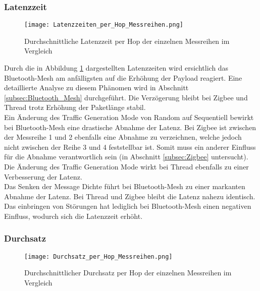 \subsubsection{Latenzzeit}\label{subsec:VergleichLatenzzeitMessreihen}

\begin{figure}[H]
	\centering
	\texttt{[image: Latenzzeiten\_per\_Hop\_Messreihen.png]}
	\caption{Durchschnittliche Latenzzeit per Hop der einzelnen Messreihen im Vergleich}\label{fig:Latenzzeiten_per_Hop_Messreihen}
\end{figure}

Durch die in Abbildung \ref{fig:Latenzzeiten_per_Hop_Messreihen} dargestellten Latenzzeiten wird ersichtlich das Bluetooth-Mesh am anfälligsten auf die Erhöhung der Payload reagiert. Eine detaillierte Analyse zu diesem Phänomen wird in Abschnitt \ref{subsec:Bluetooth_Mesh} durchgeführt. Die Verzögerung bleibt bei Zigbee und Thread trotz Erhöhung der Paketlänge stabil. \\

Ein Änderung des Traffic Generation Mode von Random auf Sequentiell bewirkt bei Bluetooth-Mesh eine drastische Abnahme der Latenz. Bei Zigbee ist zwischen der Messreihe 1 und 2 ebenfalls eine Abnahme zu verzeichnen, welche jedoch nicht zwischen der Reihe 3 und 4 feststellbar ist. Somit muss ein anderer Einfluss für die Abnahme verantwortlich sein (in Abschnitt \ref{subsec:Zigbee} untersucht). Die Änderung des Traffic Generation Mode wirkt bei Thread ebenfalls zu einer Verbesserung der Latenz.\\

Das Senken der Message Dichte führt bei Bluetooth-Mesh zu einer markanten Abnahme der Latenz. Bei Thread und Zigbee bleibt die Latenz nahezu identisch. \\
 
 Das einbringen von Störungen hat lediglich bei Bluetooth-Mesh einen negativen Einfluss, wodurch sich die Latenzzeit erhöht. 

\subsubsection{Durchsatz}\label{subsec:VergleichDurchsatzMessreihen}


\begin{figure}[H]
	\centering
	\texttt{[image: Durchsatz\_per\_Hop\_Messreihen.png]}
	\caption{Durchschnittlicher Durchsatz per Hop der einzelnen Messreihen im Vergleich}\label{fig:Durchsätze_per_Hop_Messreihen}
\end{figure}


